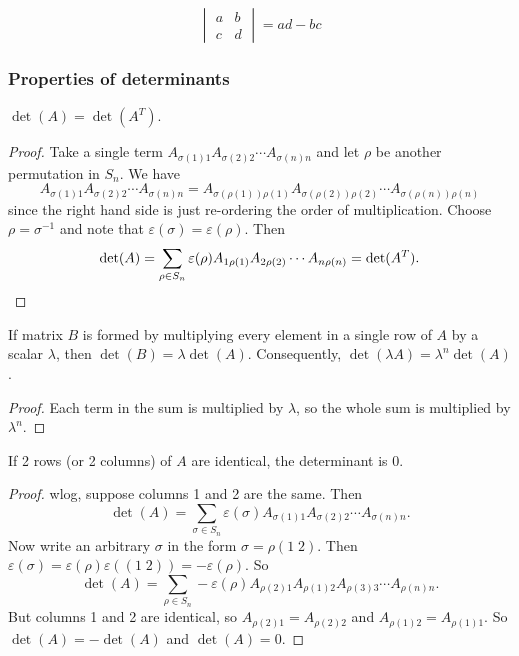 \documentclass[a4paper]{article}
\begin{document}
\begin{prop}
  \[
    \begin{vmatrix}
      a & b\\
      c & d
    \end{vmatrix} = ad - bc
  \]
\end{prop}

\subsubsection{Properties of determinants}
\begin{prop}
  $\det (A) = \det (A^T)$.
\end{prop}

\begin{proof}
  Take a single term $A_{\sigma(1)1}A_{\sigma(2)2}\cdots A_{\sigma(n)n}$ and let $\rho$ be another permutation in $S_n$. We have
  \[
    A_{\sigma(1)1}A_{\sigma(2)2}\cdots A_{\sigma(n)n} = A_{\sigma(\rho(1))\rho(1)}A_{\sigma(\rho(2))\rho(2)}\cdots A_{\sigma(\rho(n))\rho(n)}
  \]
  since the right hand side is just re-ordering the order of multiplication. Choose $\rho = \sigma^{-1}$ and note that $\varepsilon(\sigma) = \varepsilon(\rho)$. Then
  \[
    \det(A) = \sum_{\rho\in S_n} \varepsilon(\rho) A_{1\rho(1)}A_{2\rho(2)}\cdots A_{n\rho(n)} = \det (A^T). \qedhere
  \]
\end{proof}

\begin{prop}
  If matrix $B$ is formed by multiplying every element in a single row of $A$ by a scalar $\lambda$, then $\det (B) = \lambda \det (A)$. Consequently, $\det (\lambda A) = \lambda^n \det(A)$.
\end{prop}

\begin{proof}
  Each term in the sum is multiplied by $\lambda$, so the whole sum is multiplied by $\lambda^n$.
\end{proof}

\begin{prop}
  If 2 rows (or 2 columns) of $A$ are identical, the determinant is $0$.
\end{prop}

\begin{proof}
  wlog, suppose columns 1 and 2 are the same. Then
  \[
    \det (A) = \sum_{\sigma\in S_n} \varepsilon(\sigma) A_{\sigma(1)1}A_{\sigma(2)2}\cdots A_{\sigma(n)n}.
  \]
  Now write an arbitrary $\sigma$ in the form $\sigma = \rho(1\; 2)$. Then $\varepsilon(\sigma) = \varepsilon(\rho)\varepsilon((1\; 2)) = -\varepsilon(\rho)$. So
  \[
    \det (A) = \sum_{\rho\in S_n} -\varepsilon(\rho) A_{\rho(2)1}A_{\rho(1)2}A_{\rho(3)3}\cdots A_{\rho(n)n}.
  \]
  But columns 1 and 2 are identical, so $A_{\rho(2)1} = A_{\rho(2)2}$ and $A_{\rho(1)2} = A_{\rho(1)1}$. So $\det (A) = -\det (A)$ and $\det(A) = 0$.
\end{proof}
\end{document}
